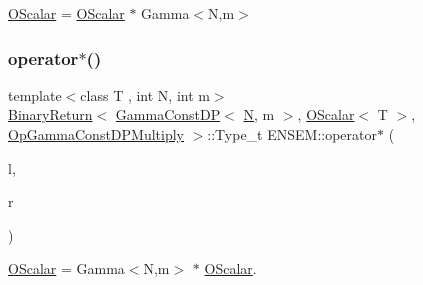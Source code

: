 \mbox{\hyperlink{classENSEM_1_1OScalar}{O\+Scalar}} = \mbox{\hyperlink{classENSEM_1_1OScalar}{O\+Scalar}} $\ast$ Gamma$<$\+N,m$>$ 

\mbox{\label{group__obsscalar_gadcaef62da25fe9015ccfbdc330caee50}} 
\subsubsection{\texorpdfstring{operator$\ast$()}{operator*()}\hspace{0.1cm}{\footnotesize\ttfamily [4/5]}}
{\footnotesize\ttfamily template$<$class T , int N, int m$>$ \\
\mbox{\hyperlink{structENSEM_1_1BinaryReturn}{Binary\+Return}}$<$ \mbox{\hyperlink{classENSEM_1_1GammaConstDP}{Gamma\+Const\+DP}}$<$ \mbox{\hyperlink{operator__name__util_8cc_a7722c8ecbb62d99aee7ce68b1752f337}{N}}, m $>$, \mbox{\hyperlink{classENSEM_1_1OScalar}{O\+Scalar}}$<$ T $>$, \mbox{\hyperlink{structENSEM_1_1OpGammaConstDPMultiply}{Op\+Gamma\+Const\+D\+P\+Multiply}} $>$\+::Type\+\_\+t E\+N\+S\+E\+M\+::operator$\ast$ (\begin{DoxyParamCaption}\item[{const \mbox{\hyperlink{classENSEM_1_1GammaConstDP}{Gamma\+Const\+DP}}$<$ \mbox{\hyperlink{operator__name__util_8cc_a7722c8ecbb62d99aee7ce68b1752f337}{N}}, m $>$ \&}]{l,  }\item[{const \mbox{\hyperlink{classENSEM_1_1OScalar}{O\+Scalar}}$<$ T $>$ \&}]{r }\end{DoxyParamCaption})\hspace{0.3cm}{\ttfamily [inline]}}



\mbox{\hyperlink{classENSEM_1_1OScalar}{O\+Scalar}} = Gamma$<$\+N,m$>$ $\ast$ \mbox{\hyperlink{classENSEM_1_1OScalar}{O\+Scalar}}. 

\mbox{\label{group__obsscalar_ga3a908302b6f4903874da2282ce03fdf7}} 
